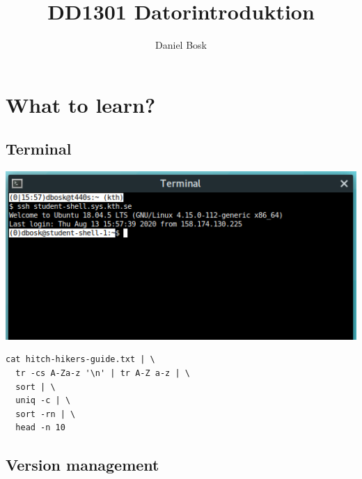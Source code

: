 \title{%
  DD1301 Datorintroduktion
}
\author{Daniel Bosk}


\mode*


\section{What to learn?}

\subsection{Terminal}

\begin{frame}
  \includegraphics[width=\columnwidth]{../../ssh/terminal.png}
\end{frame}

\begin{frame}[fragile]
  \begin{lstlisting}[numbers=none]
cat hitch-hikers-guide.txt | \
  tr -cs A-Za-z '\n' | tr A-Z a-z | \
  sort | \
  uniq -c | \
  sort -rn | \
  head -n 10
  \end{lstlisting}
\end{frame}


\subsection{Version management}

